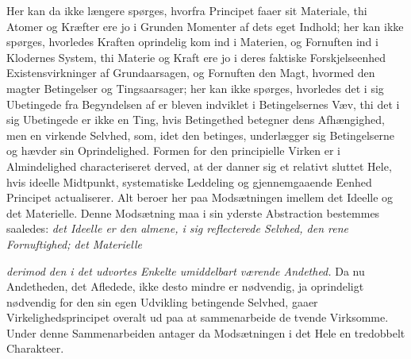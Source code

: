 \documentclass[12pt,a4paper]{book}
\begin{document}
Her kan da ikke længere spørges, hvorfra Principet faaer sit
Materiale, thi Atomer og Kræfter ere jo i Grunden Momenter af dets eget
Indhold; her kan ikke spørges, hvorledes Kraften oprindelig kom ind i
Materien, og Fornuften ind i Klodernes System, thi Materie og Kraft ere
jo i deres faktiske Forskjelseenhed Existensvirkninger af
Grundaarsagen, og Fornuften den Magt, hvormed den magter Betingelser og
Tingsaarsager; her kan ikke spørges, hvorledes det i sig Ubetingede fra
Begyndelsen af er bleven indviklet i Betingelsernes Væv, thi det i sig
Ubetingede er ikke en Ting, hvis Betingethed betegner dens
Afhængighed, men en virkende Selvhed, som, idet den betinges,
underlægger sig Betingelserne og hævder sin Oprindelighed. Formen for
den principielle Virken er i Almindelighed characteriseret derved, at
der danner sig et relativt sluttet Hele, hvis ideelle Midtpunkt,
systematiske Leddeling og gjennemgaaende Eenhed Principet actualiserer.
Alt beroer her paa Modsætningen imellem det Ideelle og det Materielle.
Denne Modsætning maa i sin yderste Abstraction bestemmes saaledes:
\emph{det Ideelle er den almene, i sig reflecterede Selvhed, den rene
Fornuftighed; det Materielle}

\setcounter{footnote}{0}
\emph{derimod den i det udvortes Enkelte umiddelbart værende
Andethed.} Da nu Andetheden, det Afledede, ikke desto mindre er
nødvendig, ja oprindeligt nødvendig for den sin egen Udvikling
betingende Selvhed, gaaer Virkelighedsprincipet overalt ud paa at
sammenarbeide de tvende Virksomme. Under denne Sammenarbeiden antager
da Modsætningen i det Hele en tredobbelt Charakteer.
\end{document}
